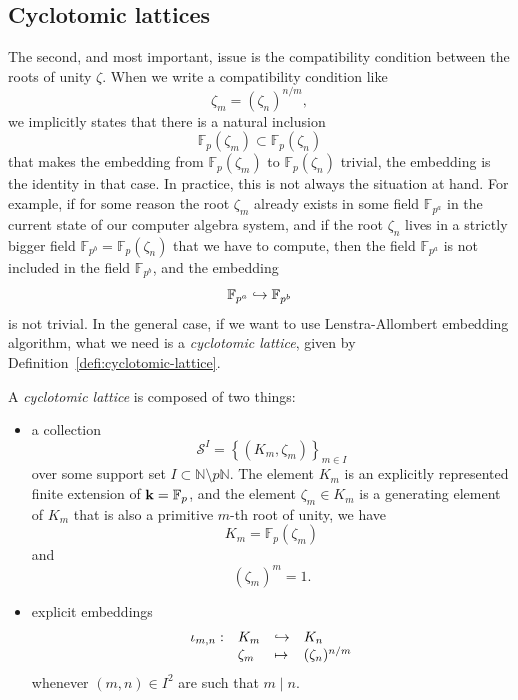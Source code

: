 \subsection{Cyclotomic lattices}

The second, and most important, issue is the compatibility condition between the
roots of unity $\zeta$. When we write a compatibility condition like
\[
  \zeta_m = (\zeta_n)^{n/m},
\]
we implicitly states that there is a natural inclusion 
\[
  \mathbb{F}_p(\zeta_m)\subset\mathbb{F}_p(\zeta_n)
\]
that makes the embedding from $\mathbb{F}_{p}(\zeta_m)$ to
$\mathbb{F}_{p}(\zeta_n)$ trivial, \ie the embedding is the identity in that
case. In practice, this is not always the situation at hand. For example,
if for some reason the root $\zeta_m$ already exists in some field
$\mathbb{F}_{p^a}$ in the current state of our computer algebra system, and if the
root $\zeta_n$ lives in a strictly bigger field
$\mathbb{F}_{p^b}=\mathbb{F}_p(\zeta_n)$ that we have to compute, then the field
$\mathbb{F}_{p^a}$ is not included in the field $\mathbb{F}_{p^b}$, and the
embedding
\[
  \mathbb{F}_{p^a}\hookrightarrow \mathbb{F}_{p^b}
\]
is not trivial. In the general case, if we want to use Lenstra-Allombert
embedding algorithm, what we need is a \emph{cyclotomic
lattice}, given by Definition~\ref{defi:cyclotomic-lattice}.
\begin{defi}
  \label{defi:cyclotomic-lattice}
  A \emph{cyclotomic lattice} is composed of two things:
  \begin{itemize}
    \item a collection
  \[
    \mathcal S^I = \left\{ (K_m, \zeta_m) \right\}_{m\in I}
  \]
  over some support set $I\subset \mathbb{N}\setminus p\mathbb{N}$. The element
  $K_m$ is an explicitly represented finite extension of $\mathbf{k}=\mathbb{F}_p$, and
  the element $\zeta_m\in K_m$ is a generating element of $K_m$ that is also a
  primitive $m$-th root of unity, \ie we have
  \[
  K_m = \mathbb{F}_{p}(\zeta_m)
  \]
  and
  \[
  (\zeta_m)^m=1.
  \]
    \item explicit embeddings
      \[
        \begin{array}{llll}
          \iota_{m, n}: & K_m & \hookrightarrow & K_n\\
          & \zeta_m & \mapsto & (\zeta_n)^{n/m}
        \end{array}
      \]
      whenever $(m, n)\in I^2$ are such that $m\mid n$.
  \end{itemize}
\end{defi}

